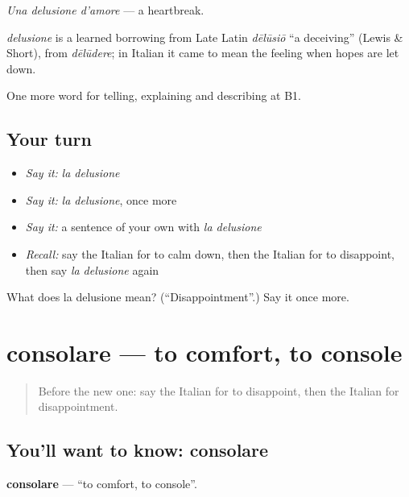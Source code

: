 \emph{Una delusione d'amore} — a heartbreak.

\begin{cousinweb}
\emph{delusione} is a learned borrowing from Late Latin \emph{dēlūsiō} \textquotedblleft{}a deceiving\textquotedblright{} (Lewis \& Short), from \emph{dēlūdere}; in Italian it came to mean the feeling when hopes are let down.
\end{cousinweb}

\begin{grammarlens}[title={What you've built}]
One more word for telling, explaining and describing at B1.
\end{grammarlens}

\subsection*{Your turn}
\begin{itemize}
\raggedright
  \item \emph{Say it:} \emph{la delusione}
  \item \emph{Say it:} \emph{la delusione}, once more
  \item \emph{Say it:} a sentence of your own with \emph{la delusione}
  \item \emph{Recall:} say the Italian for to calm down, then the Italian for to disappoint, then say \emph{la delusione} again
\end{itemize}

\begin{tcolorbox}[breakable,colback=teal!4,colframe=teal!35!black,title={Before you move on}]
What does la delusione mean? (\textquotedblleft{}Disappointment\textquotedblright{}.) Say it once more.
\end{tcolorbox}
\section[consolare]{consolare — to comfort, to console}

\label{lesson:IT-C476-consolare}



\begin{quote}
Before the new one: say the Italian for to disappoint, then the Italian for disappointment.
\end{quote}

\subsection*{You'll want to know: consolare}
\textbf{consolare} — \textquotedblleft{}to comfort, to console\textquotedblright{}.

